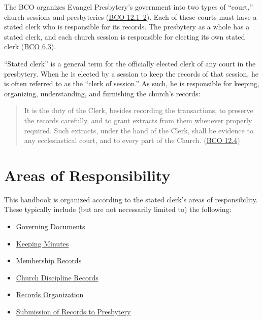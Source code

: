 \documentclass[
]{book}
\providecommand{\tightlist}{%
  \setlength{\itemsep}{0pt}\setlength{\parskip}{0pt}}
\begin{document}
The BCO organizes Evangel Presbytery's government into two types of ``court,'' church sessions and presbyteries (\href{https://evangel.pressbooks.com/chapter/12-church-courts-in-general/}{BCO 12.1--2}). Each of these courts must have a stated clerk who is responsible for its records. The presbytery as a whole has a stated clerk, and each church session is responsible for electing its own stated clerk (\href{https://evangel.pressbooks.com/chapter/6-the-organization-of-a-particular-church/}{BCO 6.3}).

``Stated clerk'' is a general term for the officially elected clerk of any court in the presbytery. When he is elected by a session to keep the records of that session, he is often referred to as the ``clerk of session.'' As such, he is responsible for keeping, organizing, understanding, and furnishing the church's records:

\begin{quote}
It is the duty of the Clerk, besides recording the transactions, to preserve the records carefully, and to grant extracts from them whenever properly required. Such extracts, under the hand of the Clerk, shall be evidence to any ecclesiastical court, and to every part of the Church. (\href{https://evangel.pressbooks.com/chapter/12-church-courts-in-general/}{BCO 12.4})
\end{quote}

\hypertarget{areas-of-responsibility}{%
\section{Areas of Responsibility}\label{areas-of-responsibility}}

This handbook is organized according to the stated clerk's areas of responsibility. These typically include (but are not necessarily limited to) the following:

\begin{itemize}
\tightlist
\item
  \protect\hyperlink{governing-documents}{Governing Documents}
\item
  \protect\hyperlink{keeping-minutes}{Keeping Minutes}
\item
  \protect\hyperlink{membership-records}{Membership Records}
\item
  \protect\hyperlink{church-discipline-records}{Church Discipline Records}
\item
  \protect\hyperlink{records-organization}{Records Organization}
\item
  \protect\hyperlink{submission-of-records-to-presbytery}{Submission of Records to Presbytery}
\end{itemize}
\end{document}
